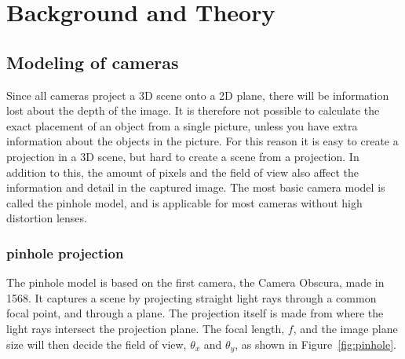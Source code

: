 
\chapter{Background and Theory}
\section{Modeling of cameras}

Since all cameras project a 3D scene onto a 2D plane, there will be information lost about the depth of the image. It is therefore not possible to calculate the exact placement of an object from a single picture, unless you have extra information about the objects in the picture. For this reason it is easy to create a projection in a 3D scene, but hard to create a scene from a projection. In addition to this, the amount of pixels and the field of view also affect the information and detail in the captured image. The most basic camera model is called the pinhole model, and is applicable for most cameras without high distortion lenses.

\subsection{pinhole projection} \label{sec:pinhole}
The pinhole model is based on the first camera, the Camera Obscura, made in 1568. It captures a scene by projecting straight light rays through a common focal point, and through a plane. The projection itself is made from where the light rays intersect the projection plane. The focal length, $f$, and the image plane size will then decide the field of view, $\theta_x$ and $\theta_y$, as shown in Figure~\ref{fig:pinhole}. 

